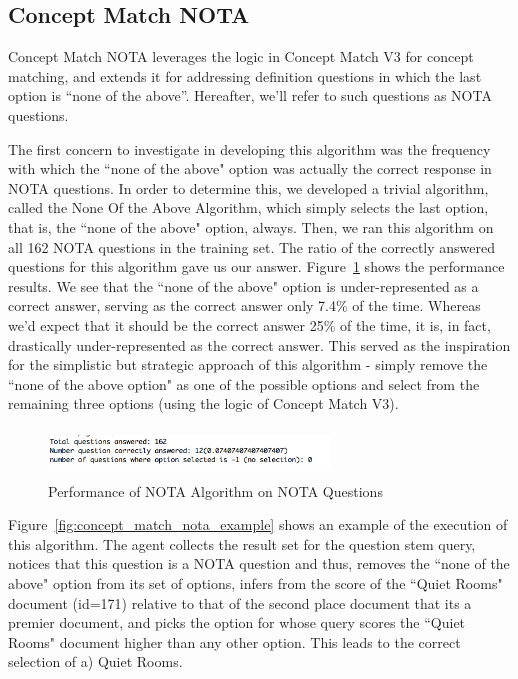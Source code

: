 \subsection{Concept Match NOTA}

Concept Match NOTA leverages the logic in Concept Match V3 for concept matching, and extends it for addressing definition questions in which the last option is ``none of the above''.  Hereafter, we'll refer to such questions as NOTA questions.

The first concern to investigate in developing this algorithm was the frequency with which the ``none of the above" option was actually the correct response in NOTA questions.  In order to determine this, we developed a trivial algorithm, called the None Of the Above Algorithm, which simply selects the last option, that is, the ``none of the above" option, always.  Then, we ran this algorithm on all 162 NOTA questions in the training set.  The ratio of the correctly answered questions for this algorithm gave us our answer.  Figure~\ref{fig:nota_training_set_performance} shows the performance results.  We see that the ``none of the above" option is under-represented as a correct answer, serving as the correct answer only 7.4\% of the time.  Whereas we'd expect that it should be the correct answer 25\% of the time, it is, in fact, drastically under-represented as the correct answer.  This served as the inspiration for the simplistic but strategic approach of this algorithm - simply remove the ``none of the above option" as one of the possible options and select from the remaining three options (using the logic of Concept Match V3).

\begin{figure}
\centering
\vspace{0.75in}
\includegraphics[width=75mm, height=13mm]{nota_training_set_performance.png}
\caption{Performance of NOTA Algorithm on NOTA Questions}
\label{fig:nota_training_set_performance}
\end{figure}


Figure~\ref{fig:concept_match_nota_example} shows an example of the execution of this algorithm.  The agent collects the result set for the question stem query, notices that this question is a NOTA question and thus, removes the ``none of the above" option from its set of options, infers from the score of the ``Quiet Rooms" document (id=171) relative to that of the second place document that its a premier document, and picks the option for whose query scores the ``Quiet Rooms" document higher than any other option.  This leads to the correct selection of a) Quiet Rooms.


